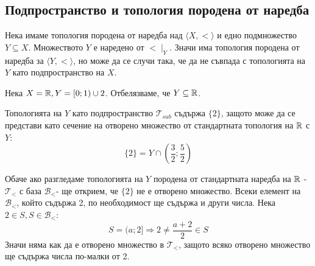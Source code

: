 \subsection{Подпространство и топология породена от наредба}
Нека имаме топология породена от наредба над $\langle X, < \rangle$ и едно подмножество $Y \subseteq X$. Множеството $Y$ е наредено от $< \mid_Y$. Значи има топология породена от наредба за $\langle Y, < \rangle$, но може да се случи така, че да не съвпада с топологията на $Y$ като подпространство на $X$.
\begin{example}
    Нека $X = {\mathbb{R}}, Y = [0; 1) \cup {2}$. Отбелязваме, че $Y \subseteq {\mathbb{R}}$.
    
    Топологията на $Y$ като подпространство $\mathcal T_{sub}$ съдържа $\{2\}$, защото може да се представи като сечение на отворено множество от стандартната топология на ${\mathbb{R}}$ с $Y$:
    \begin{equation}
        \{2\} = Y \cap \left(\frac{3}{2}; \frac{5}{2}\right)
    \end{equation}

    Обаче ако разгледаме топологията на $Y$ породена от стандартната наредба на ${\mathbb{R}}$ - $\mathcal T_<$ с база $\mathcal B_<$-  ще открием, че $\{2\}$ не е отворено множество. Всеки елемент на $\mathcal B_<$, който съдържа 2, по необходимост ще съдържа и други числа. Нека $2 \in S, S \in \mathcal B_<$:
    \begin{equation}
        S = (a; 2] \Rightarrow 2 \neq \frac{a + 2}{2} \in S
    \end{equation}
    Значи няма как да е отворено множество в $\mathcal T_<$, защото всяко отворено множество ще съдържа числа по-малки от 2.
\end{example}

